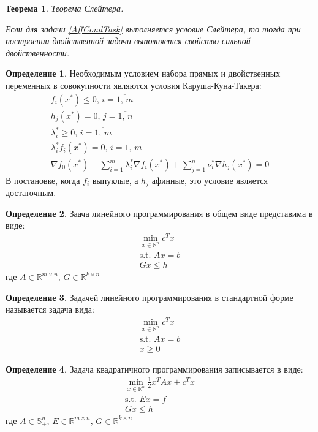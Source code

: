 \documentclass[a4paper,12pt]{article}
\renewcommand{\leq}{\ensuremath{\leqslant}}
\renewcommand{\geq}{\ensuremath{\geqslant}}
\theoremstyle{plain}
\newtheorem{theorem}{Теорема}[section]
\theoremstyle{definition}
\newtheorem{definition}{Определение}[section]
\theoremstyle{remark}
\begin{document}
\begin{theorem} Теорема Слейтера.

	Если для задачи \eqref{AffCondTask} выполняется условие Слейтера, то тогда при построении двойственной задачи выполняется свойство сильной двойственности.
\end{theorem}

\begin{definition}
	Необходимым условием набора прямых и двойственных переменных в совокупности являются условия Каруша-Куна-Такера:
	\begin{align}
		f_i(x^*) \leq 0,\, i = \overline{1,\,m}         \\
		h_j(x^*) = 0,\, j = \overline{1,\,n}            \\
		\lambda_i^* \geq 0,\, i = \overline{1,\,m}      \\
		\lambda_i^*f_i(x^*) = 0,\, i = \overline{1,\,m} \\
		\nabla f_0(x^*) + \sum_{i = 1}^m \lambda_i^* \nabla f_i(x^*) + \sum_{j = 1}^n \nu_i^* \nabla h_j(x^*) = 0
	\end{align}
	В постановке, когда $f_i$ выпуклые, а $h_j$ афинные, это условие является достаточным.
\end{definition}

\begin{definition}
	Заача линейного программирования в общем виде представима в виде:
	\begin{align*}
		\min_{x \in \mathbb{R}^n} c^Tx \\
		\text{s.t. } Ax=b              \\
		Gx \leq h
	\end{align*}
	где $A \in \mathbb{R}^{m \times n},\, G \in \mathbb{R}^{k \times n}$
\end{definition}

\begin{definition}
	Задачей линейного программирования в стандартной форме называется задача вида:
	\begin{align*}
		\min_{x \in \mathbb{R}^n} c^Tx \\
		\text{s.t. }Ax = b             \\
		x \geq 0
	\end{align*}
\end{definition}

\begin{definition}
	Задача квадратичного программирования записывается в виде:
	\begin{align*}
		\min_{x \in \mathbb{R}^n} \frac{1}{2}x^TAx + c^Tx \\
		\text{s.t. } Ex = f                               \\
		Gx \leq h
	\end{align*}
	где $A \in \mathbb{S}^n_+,\, E \in \mathbb{R}^{m \times n},\, G \in \mathbb{R}^{k \times n}$
\end{definition}
\end{document}
